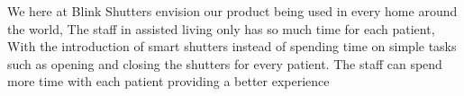 We here at Blink Shutters envision our product being used in every home around the world, The staff in assisted living only has so much time for each patient, With the introduction of smart shutters instead of spending time on simple tasks such as opening and closing the shutters for every patient. The staff can spend more time with each patient providing a better experience